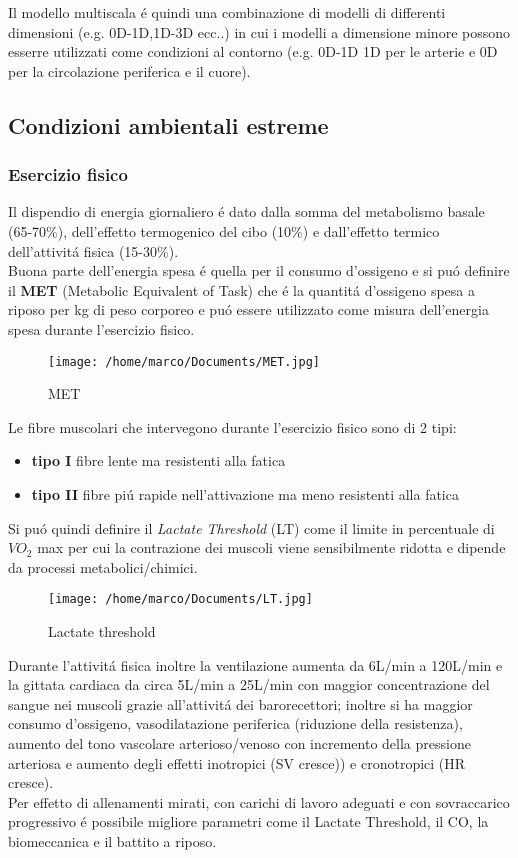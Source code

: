 \documentclass[10pt]{article}
\begin{document}
Il modello multiscala é quindi una combinazione di modelli di differenti dimensioni (e.g. 0D-1D,1D-3D ecc..) in cui i modelli a dimensione minore possono esserre utilizzati come condizioni al contorno (e.g. 0D-1D \textrightarrow 1D per le arterie e 0D per la circolazione periferica e il cuore).

\subsection{Condizioni ambientali estreme}

\subsubsection{Esercizio fisico}

Il dispendio di energia giornaliero é dato dalla somma del metabolismo basale (65-70\%), dell'effetto termogenico del cibo (10\%) e dall'effetto termico dell'attivitá fisica (15-30\%).  \\
Buona parte dell'energia spesa é quella per il consumo d'ossigeno e si puó definire il \textbf{MET} (Metabolic Equivalent of Task) che é la quantitá d'ossigeno spesa a riposo per kg di peso corporeo e puó essere utilizzato come misura dell'energia spesa durante l'esercizio fisico.
 
\begin{figure}[h!]
\centering
\texttt{[image: /home/marco/Documents/MET.jpg]}
\caption{MET}
\label{fig:MET}
\end{figure}

Le fibre muscolari che intervegono durante l'esercizio fisico sono di  2 tipi:
\begin{itemize}
\item \textbf{tipo I} \textrightarrow fibre lente ma resistenti alla fatica
\item \textbf{tipo II} \textrightarrow fibre piú rapide nell'attivazione ma meno resistenti alla fatica
\end{itemize}
Si puó quindi definire il \textit{Lactate Threshold} (LT) come il limite in percentuale di $VO_2$ max per cui la contrazione dei muscoli viene sensibilmente ridotta e dipende da processi metabolici/chimici.

\begin{figure}[h!]
\centering
\texttt{[image: /home/marco/Documents/LT.jpg]}
\caption{Lactate threshold}
\label{fig:LT}
\end{figure}

Durante l'attivitá fisica inoltre la ventilazione aumenta da 6L/min a 120L/min e la gittata cardiaca da circa 5L/min a 25L/min con maggior concentrazione del sangue nei muscoli grazie all'attivitá dei barorecettori; inoltre si ha maggior consumo d'ossigeno, vasodilatazione periferica (riduzione della resistenza), aumento del tono vascolare arterioso/venoso con incremento della pressione arteriosa e aumento degli effetti inotropici (SV cresce)) e cronotropici (HR cresce). \\
Per effetto di allenamenti mirati, con carichi di lavoro adeguati e con sovraccarico progressivo é possibile migliore  parametri come il Lactate Threshold, il CO, la biomeccanica e il battito a riposo.
\end{document}
